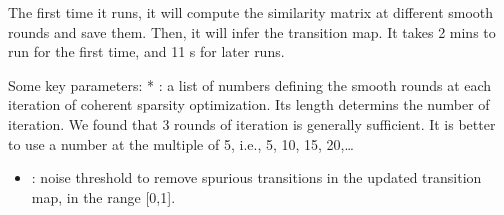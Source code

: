 \documentclass[letterpaper,10pt,english]{sphinxmanual}
\begin{document}
The first time it runs, it will compute the similarity matrix at different smooth rounds and save them. Then, it will infer the transition map. It takes 2 mins to run for the first time, and 11 s for later runs.

Some key parameters: * : a list of numbers defining the smooth rounds at each iteration of coherent sparsity optimization. Its length determins the number of iteration. We found that 3 rounds of iteration is generally sufficient. It is better to use a number at the multiple of 5, i.e., 5, 10, 15, 20,…
\begin{itemize}
\item {} 
: noise threshold to remove spurious transitions in the updated transition map, in the range {[}0,1{]}.

\end{itemize}

{
\begin{sphinxVerbatim}[commandchars=\\\{\}]
\llap{\color{nbsphinxin}[19]:\,\hspace{\fboxrule}\hspace{\fboxsep}} 
\PYG{p}{[}\PYG{p}{]}
\PYG{p}{[}\PYG{p}{]}
\end{sphinxVerbatim}
}
\end{document}
